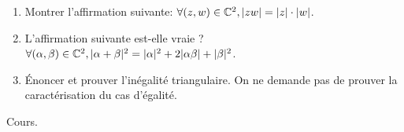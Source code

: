 \begin{exo}
\begin{enumerate}
\item Montrer l'affirmation suivante:  $\forall (z,w)\in \mathbb{C}^2, |zw|=|z|\cdot|w|$.
\item L'affirmation suivante est-elle vraie ?
$\forall (\alpha, \beta) \in \mathbb{C}^2, |\alpha+\beta|^2 = |\alpha|^2+2|\alpha\beta| + |\beta|^2$.
\item Énoncer et prouver l'inégalité triangulaire. On ne demande pas de prouver la caractérisation du cas d'égalité.
\end{enumerate}
\begin{sol}
Cours.
\end{sol}
\end{exo}










